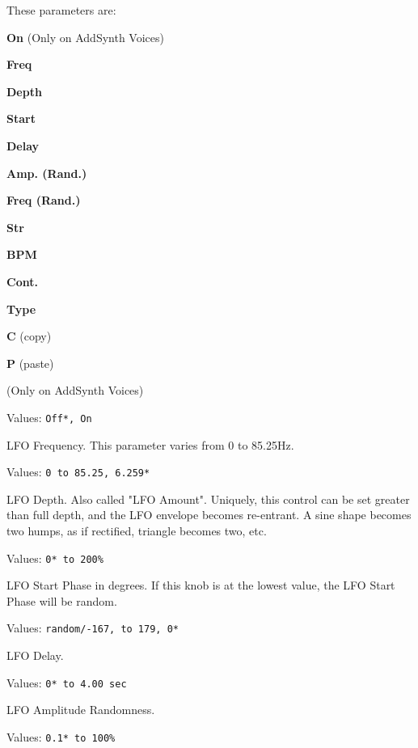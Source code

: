 These parameters are:

   \begin{enumber}
      \item \textbf{On} (Only on AddSynth Voices)
      \item \textbf{Freq}
      \item \textbf{Depth}
      \item \textbf{Start}
      \item \textbf{Delay}
      \item \textbf{Amp. (Rand.)}
      \item \textbf{Freq (Rand.)}
      \item \textbf{Str}
      \item \textbf{BPM}
      \item \textbf{Cont.}
      \item \textbf{Type}
      \item \textbf{C} (copy)
      \item \textbf{P} (paste)
   \end{enumber}

   \setcounter{ItemCounter}{0}      %

    (Only on AddSynth Voices)

   Values: \texttt{Off*, On}

   LFO Frequency.
   This parameter varies from 0 to 85.25Hz.

   Values: \texttt{0 to 85.25, 6.259*}

   LFO Depth.  Also called "LFO Amount". Uniquely, this control can be set
   greater than full depth, and the LFO envelope becomes re-entrant. A sine
   shape becomes two humps, as if rectified, triangle becomes two, etc.

   Values: \texttt{0* to 200\%}

   LFO Start Phase in degrees. If this knob is at the lowest value, the LFO Start
   Phase will be random.

   Values: \texttt{random/-167, to 179, 0*}

   LFO Delay.

   Values: \texttt{0* to 4.00 sec}

   LFO Amplitude Randomness.

   Values: \texttt{0.1* to 100\%}

